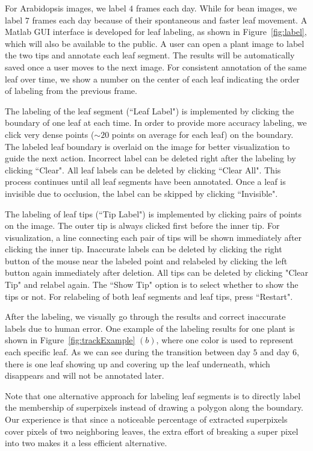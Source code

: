For Arabidopsis images, we label $4$ frames each day.
While for bean images, we label $7$ frames each day because of their spontaneous and faster leaf movement.
A Matlab GUI interface is developed for leaf labeling, as shown in Figure~\ref{fig:label}, which will also be available to the public.
A user can open a plant image to label the two tips and annotate each leaf segment.
The results will be automatically saved once a user moves to the next image.
For consistent annotation of the same leaf over time, we show a number on the center of each leaf indicating the order of labeling from the previous frame.

The labeling of the leaf segment (``Leaf Label") is implemented by clicking the boundary of one leaf at each time.
In order to provide more accuracy labeling, we click very dense points ($\sim20$ points on average for each leaf) on the boundary.
The labeled leaf boundary is overlaid on the image for better visualization to guide the next action.
Incorrect label can be deleted right after the labeling by clicking ``Clear".
All leaf labels can be deleted by clicking ``Clear All".
This process continues until all leaf segments have been annotated.
Once a leaf is invisible due to occlusion, the label can be skipped by clicking ``Invisible".

The labeling of leaf tips (``Tip Label") is implemented by clicking pairs of points on the image.
The outer tip is always clicked first before the inner tip.
For visualization, a line connecting each pair of tips will be shown immediately after clicking the inner tip.
Inaccurate labels can be deleted by clicking the right button of the mouse near the labeled point and relabeled by clicking the left button again immediately after deletion.
All tips can be deleted by clicking "Clear Tip" and relabel again.
The ``Show Tip" option is to select whether to show the tips or not. 
For relabeling of both leaf segments and leaf tips, press ``Restart". 

After the labeling, we visually go through the results and correct inaccurate labels due to human error.
One example of the labeling results for one plant is shown in Figure~\ref{fig:trackExample} $(b)$, where one color is used to represent each specific leaf.
As we can see during the transition between day $5$ and day $6$, there is one leaf showing up and covering up the leaf underneath, which disappears and will not be annotated later.

Note that one alternative approach for labeling leaf segments is to directly label the membership of superpixels instead of drawing a polygon along the boundary.
Our experience is that since a noticeable percentage of extracted superpixels cover pixels of two neighboring leaves, the extra effort of breaking a super pixel into two makes it a less efficient alternative.


